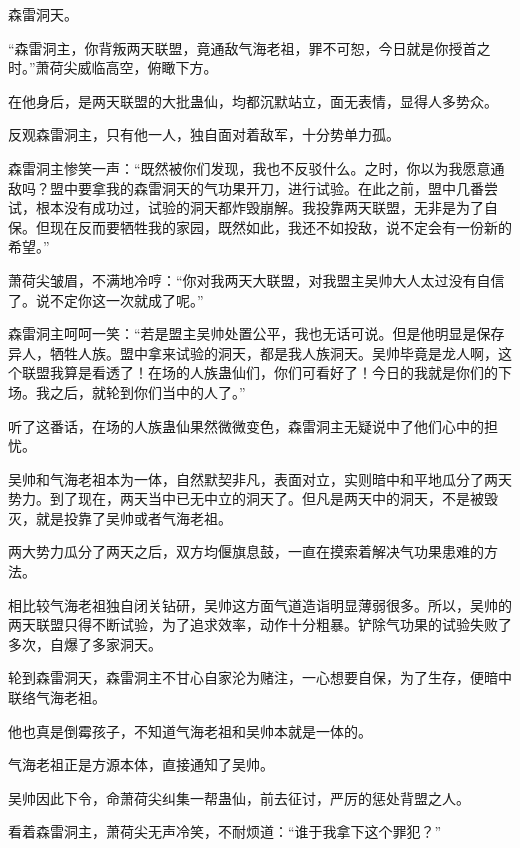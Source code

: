 
\begin{this_body}



森雷洞天。

“森雷洞主，你背叛两天联盟，竟通敌气海老祖，罪不可恕，今日就是你授首之时。”萧荷尖威临高空，俯瞰下方。

在他身后，是两天联盟的大批蛊仙，均都沉默站立，面无表情，显得人多势众。

反观森雷洞主，只有他一人，独自面对着敌军，十分势单力孤。

森雷洞主惨笑一声：“既然被你们发现，我也不反驳什么。之时，你以为我愿意通敌吗？盟中要拿我的森雷洞天的气功果开刀，进行试验。在此之前，盟中几番尝试，根本没有成功过，试验的洞天都炸毁崩解。我投靠两天联盟，无非是为了自保。但现在反而要牺牲我的家园，既然如此，我还不如投敌，说不定会有一份新的希望。”

萧荷尖皱眉，不满地冷哼：“你对我两天大联盟，对我盟主吴帅大人太过没有自信了。说不定你这一次就成了呢。”

森雷洞主呵呵一笑：“若是盟主吴帅处置公平，我也无话可说。但是他明显是保存异人，牺牲人族。盟中拿来试验的洞天，都是我人族洞天。吴帅毕竟是龙人啊，这个联盟我算是看透了！在场的人族蛊仙们，你们可看好了！今日的我就是你们的下场。我之后，就轮到你们当中的人了。”

听了这番话，在场的人族蛊仙果然微微变色，森雷洞主无疑说中了他们心中的担忧。

吴帅和气海老祖本为一体，自然默契非凡，表面对立，实则暗中和平地瓜分了两天势力。到了现在，两天当中已无中立的洞天了。但凡是两天中的洞天，不是被毁灭，就是投靠了吴帅或者气海老祖。

两大势力瓜分了两天之后，双方均偃旗息鼓，一直在摸索着解决气功果患难的方法。

相比较气海老祖独自闭关钻研，吴帅这方面气道造诣明显薄弱很多。所以，吴帅的两天联盟只得不断试验，为了追求效率，动作十分粗暴。铲除气功果的试验失败了多次，自爆了多家洞天。

轮到森雷洞天，森雷洞主不甘心自家沦为赌注，一心想要自保，为了生存，便暗中联络气海老祖。

他也真是倒霉孩子，不知道气海老祖和吴帅本就是一体的。

气海老祖正是方源本体，直接通知了吴帅。

吴帅因此下令，命萧荷尖纠集一帮蛊仙，前去征讨，严厉的惩处背盟之人。

看着森雷洞主，萧荷尖无声冷笑，不耐烦道：“谁于我拿下这个罪犯？”


\end{this_body}

